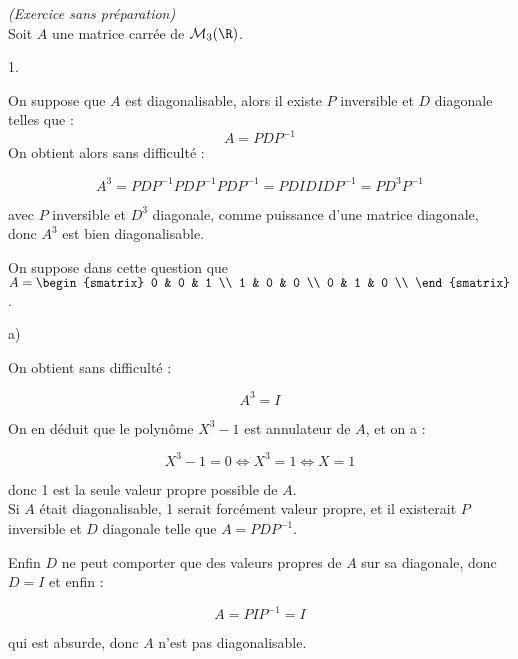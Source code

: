 \documentclass[11pt]{article}%
\begin{document}
\addtocounter{exercice}{-1}
\begin{exercice}{\it (Exercice sans préparation)}~\\
 Soit $A$ une matrice carrée de $\mathcal{M}_{3} ( \R ) $.
 \begin{noliste}{1.}
 \setlength{\itemsep}{4mm}
 \item On suppose que $A$ est diagonalisable, alors il existe $P$
 inversible et $D$ diagonale telles que :
 \[
 A = P D P^{-1} 
 \]
 On obtient alors sans difficulté :
 
\[
 A^{3} = P D P^{-1} P D P^{-1} P D P^{-1} = P D I D I D P^{-1} = P
D^{3} P^{-1 } 
\]
 
 avec $P$ inversible et $D^{3}$ diagonale, comme puissance d'une
 matrice diagonale, donc $A^{3}$ est bien diagonalisable.

 \item On suppose dans cette question que $A = \begin{smatrix}
0 & 0
 & 1 \\
1 & 0 & 0 \\
0 & 1 & 0
 \\
\end{smatrix}
$. 
 \begin{noliste}{a)}
 \setlength{\itemsep}{2mm}
 \item On obtient sans difficulté :
 
\[
 A^{3} = I
\]
 
 \item On en déduit que le polynôme $X^{3} - 1$ est annulateur de
 $A$, et on a :
 
\[
 X^{3} - 1 = 0 \Longleftrightarrow X^{3} = 1 \Longleftrightarrow X = 
 1
\]
 
 donc 1 est la seule valeur propre possible de $A$. \\

 Si $A$ était diagonalisable, 1 serait forcément valeur propre,
 et il existerait $P$ inversible et $D$ diagonale telle que $ A = 
 P D P^{-1}$.

 Enfin $D$ ne peut comporter que des valeurs propres de $A$ sur
 sa diagonale, donc $D = I$ et enfin :
 
\[
 A = P I P^{-1} = I 
\]
 
 qui est absurde, donc $A$ n'est pas diagonalisable.
 
 \end{noliste}
 \end{noliste}
\end{exercice}
\end{document}
